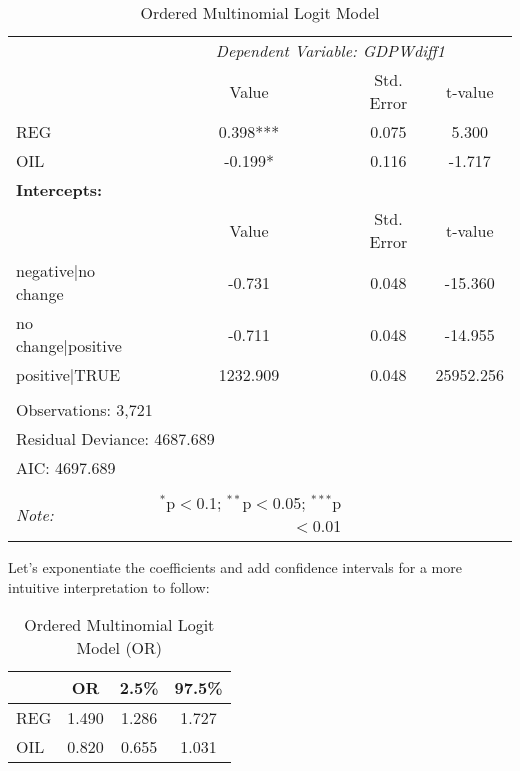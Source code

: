 \documentclass[12pt,letterpaper]{article}
\begin{document}
\begin{enumerate}
	\begin{table}[H] 
\centering 
\caption{Ordered Multinomial Logit Model} 
\label{} 
\begin{tabular}{lccc} 
\hline 
\hline 
& \multicolumn{3}{c}{\textit{Dependent Variable: GDPWdiff1}} \\
\cline{2-4} 
& Value & Std. Error & t-value \\ 
\hline 
REG & 0.398*** & 0.075 & 5.300 \\ 
OIL & -0.199* & 0.116 & -1.717 \\ 
\hline 
\multicolumn{4}{l}{\textbf{Intercepts:}} \\
\hline 
& Value & Std. Error & t-value \\ 
\hline 
negative|no change & -0.731 & 0.048 & -15.360 \\
no change|positive & -0.711 & 0.048 & -14.955 \\
positive|TRUE & 1232.909 & 0.048 & 25952.256 \\

\hline \\[-1.8ex] 
\multicolumn{4}{l}{Observations: 3,721}  \\ 
\multicolumn{4}{l}{Residual Deviance: 4687.689} \\
\multicolumn{4}{l}{AIC: 4697.689} \\
\hline 
\hline \\[-1.8ex] 
\textit{Note:}  & \multicolumn{1}{r}{$^{*}$p$<$0.1; $^{**}$p$<$0.05; $^{***}$p$<$0.01} \\ 
\hline 
\end{tabular} 
\end{table}


		Let's exponentiate the coefficients and add confidence intervals for a more intuitive interpretation to follow: 
	
	 
	
	
	\begin{table}[H] 
\centering 
\caption{Ordered Multinomial Logit Model (OR)} 
\begin{tabular}{lccc} 
\hline 
& OR & 2.5\% & 97.5\% \\ 
\hline 
REG & 1.490 & 1.286 & 1.727 \\ 
OIL & 0.820 & 0.655 & 1.031 \\ 
\hline 
\end{tabular} 
\end{table}
\end{enumerate}
\end{document}
